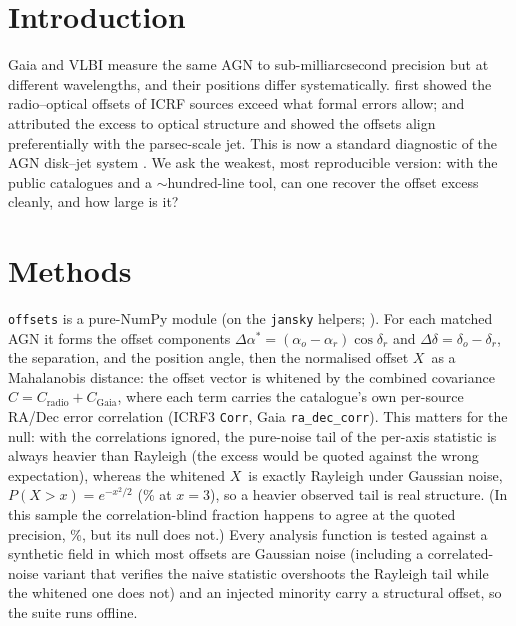 \documentclass[twocolumn]{aastex631}
\newcommand{\code}[1]{\texttt{#1}}
\newcommand{\xnorm}{\ensuremath{X}}
\begin{document}
\section{Introduction}
Gaia and VLBI measure the same AGN to sub-milliarcsecond precision but at different wavelengths, and
their positions differ systematically. \citet{mignard2016} first showed the radio--optical offsets of
ICRF sources exceed what formal errors allow; \citet{petrovkovalev2017} and \citet{kovalev2017}
attributed the excess to optical structure and showed the offsets align preferentially with the
parsec-scale jet. This is now a standard diagnostic of the AGN disk--jet system \citep{plavin2019}. We
ask the weakest, most reproducible version: with the public catalogues and a $\sim$hundred-line tool,
can one recover the offset excess cleanly, and how large is it?

\section{Methods}
\code{offsets} is a pure-NumPy module (on the \code{jansky} helpers; \citealt{jansky}). For each
matched AGN it forms the offset components $\Delta\alpha^*=(\alpha_o-\alpha_r)\cos\delta_r$ and
$\Delta\delta=\delta_o-\delta_r$, the separation, and the position angle, then the normalised
offset \xnorm\ as a Mahalanobis distance: the offset vector is whitened by the combined covariance
$C=C_\mathrm{radio}+C_\mathrm{Gaia}$, where each term carries the catalogue's own per-source
RA/Dec error correlation (ICRF3 \code{Corr}, Gaia \code{ra\_dec\_corr}). This matters for the
null: with the correlations ignored, the pure-noise tail of the per-axis statistic is always
heavier than Rayleigh (the excess would be quoted against the wrong expectation), whereas
the whitened \xnorm\ is exactly Rayleigh under Gaussian noise, $P(\xnorm>x)=e^{-x^2/2}$
(\offRayleigh\% at $x=3$), so a heavier observed tail is real structure. (In this sample the
correlation-blind fraction happens to agree at the quoted precision, \offFracTailNaive\%, but
its null does not.) Every analysis function is tested against a synthetic field in which most
offsets are Gaussian noise (including a correlated-noise variant that verifies the naive
statistic overshoots the Rayleigh tail while the whitened one does not) and an injected
minority carry a structural offset, so the suite runs offline.
\end{document}
